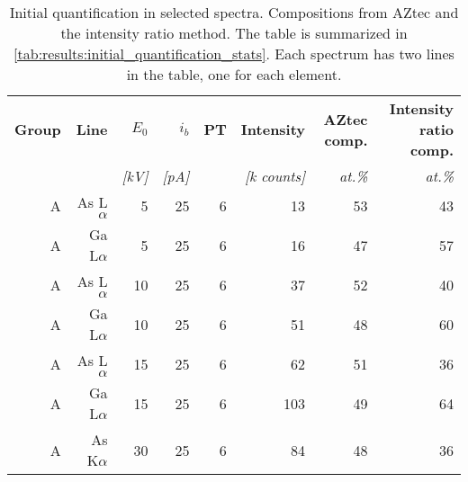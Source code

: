 
\begin{table}[phtb]
    \begin{center}
        \caption{
            Initial quantification in selected spectra.
            Compositions from AZtec and the intensity ratio method.
            The table is summarized in \cref{tab:results:initial_quantification_stats}.
            Each spectrum has two lines in the table, one for each element.
        }
        \label{tab:results:initial_quantification}
        \begin{tabular}{rrrrrrrr}
            \hline
            \textbf{ Group} & \textbf{Line} & \textbf{$E_0$} & \textbf{$i_b$} & \textbf{PT} & \textbf{Intensity} & \textbf{AZtec comp.} & \textbf{Intensity ratio comp.} \\
            \emph{}         & \emph{}       & \emph{[kV]}    & \emph{[pA]}    & \emph{}     & \emph{[k counts]}  & \emph{at.\%}          & \emph{at.\%}                    \\
            \hline
            A               & As L$\alpha$  & 5              & 25             & 6           & 13                 & 53                   & 43                             \\
            A               & Ga L$\alpha$  & 5              & 25             & 6           & 16                 & 47                   & 57                             \\
            A               & As L$\alpha$  & 10             & 25             & 6           & 37                 & 52                   & 40                             \\
            A               & Ga L$\alpha$  & 10             & 25             & 6           & 51                 & 48                   & 60                             \\
            A               & As L$\alpha$  & 15             & 25             & 6           & 62                 & 51                   & 36                             \\
            A               & Ga L$\alpha$  & 15             & 25             & 6           & 103                & 49                   & 64                             \\
            A               & As K$\alpha$  & 30             & 25             & 6           & 84                 & 48                   & 36                             \\

\end{tabular}
\end{center}
\end{table}
